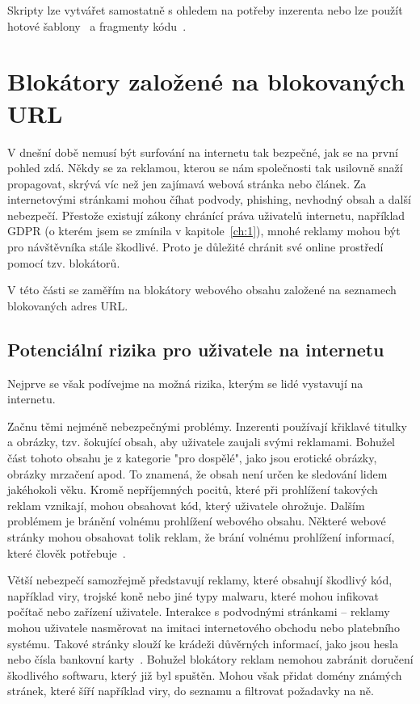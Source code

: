 Skripty lze vytvářet samostatně s ohledem na potřeby inzerenta nebo lze použít hotové šablony~\cite{adsScripts} a fragmenty kódu~\cite{fragment}. 





\chapter{Blokátory založené na blokovaných URL} 
\label{ch:3}

V dnešní době nemusí být surfování na internetu tak bezpečné, jak se na první pohled zdá. Někdy se za reklamou, kterou se nám společnosti tak usilovně snaží propagovat, skrývá víc než jen zajímavá webová stránka nebo článek. Za internetovými stránkami mohou číhat podvody, phishing, nevhodný obsah a další nebezpečí. Přestože existují zákony chránící práva uživatelů internetu, například GDPR (o kterém jsem se zmínila v kapitole~\ref{ch:1}), mnohé reklamy mohou být pro návštěvníka stále škodlivé. Proto je důležité chránit své online prostředí pomocí tzv. blokátorů.

V této části se zaměřím na blokátory webového obsahu založené na seznamech blokovaných adres URL.

\section{Potenciální rizika pro uživatele na internetu}
Nejprve se však podívejme na možná rizika, kterým se lidé vystavují na internetu.

Začnu těmi nejméně nebezpečnými problémy. Inzerenti používají křiklavé titulky a obrázky, tzv. šokující obsah, aby uživatele zaujali svými reklamami. Bohužel část tohoto obsahu je z kategorie "pro dospělé", jako jsou erotické obrázky, obrázky mrzačení apod. To znamená, že obsah není určen ke sledování lidem jakéhokoli věku. Kromě nepříjemných pocitů, které při prohlížení takových reklam vznikají, mohou obsahovat kód, který uživatele ohrožuje.
Dalším problémem je bránění volnému prohlížení webového obsahu. Některé webové stránky mohou obsahovat tolik reklam, že brání volnému prohlížení informací, které člověk potřebuje~\cite{adblock}.

Větší nebezpečí samozřejmě představují reklamy, které obsahují škodlivý kód, například viry, trojské koně nebo jiné typy malwaru, které mohou infikovat počítač nebo zařízení uživatele. Interakce s podvodnými stránkami -- reklamy mohou uživatele nasměrovat na imitaci internetového obchodu nebo platebního systému. Takové stránky slouží ke krádeži důvěrných informací, jako jsou hesla nebo čísla bankovní karty~\cite{adblock}. Bohužel blokátory reklam nemohou zabránit doručení škodlivého softwaru, který již byl spuštěn. Mohou však přidat domény známých stránek, které šíří například viry, do seznamu a filtrovat požadavky na ně.

